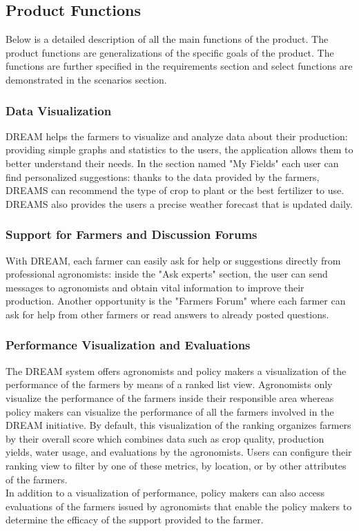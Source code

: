 \subsection{Product Functions}
\begin{flushleft}

Below is a detailed description of all the main functions of the product. The product functions are generalizations of the specific goals of the product. The functions are further specified in the requirements section and select functions are demonstrated in the scenarios section. 

\subsubsection{Data Visualization}
DREAM helps the farmers to visualize and analyze data about their production: providing simple graphs and statistics to the users, the application allows them to better understand their needs. In the section named "My Fields" each user can find personalized suggestions: thanks to the data provided by the farmers, DREAMS can recommend the type of crop to plant or the best fertilizer to use. DREAMS also provides the users a precise weather forecast that is updated daily.

\subsubsection{Support for Farmers and Discussion Forums}
With DREAM, each farmer can easily ask for help or suggestions directly from professional agronomists: inside the "Ask experts" section, the user can send messages to agronomists and obtain vital information to improve their production. Another opportunity is the "Farmers Forum" where each farmer can ask for help from other farmers or read answers to already posted questions.

\subsubsection{Performance Visualization and Evaluations}
The DREAM system offers agronomists and policy makers a visualization of the performance of the farmers by means of a ranked list view. Agronomists only visualize the performance of the farmers inside their responsible area whereas policy makers can visualize the performance of all the farmers involved in the DREAM initiative. By default, this visualization of the ranking organizes farmers by their overall score which combines data such as crop quality, production yields, water usage, and evaluations by the agronomists. Users can configure their ranking view to filter by one of these metrics, by location, or by other attributes of the farmers. \\
\smallskip
In addition to a visualization of performance, policy makers can also access evaluations of the farmers issued by agronomists that enable the policy makers to determine the efficacy of the support provided to the farmer. 


\end{flushleft}
